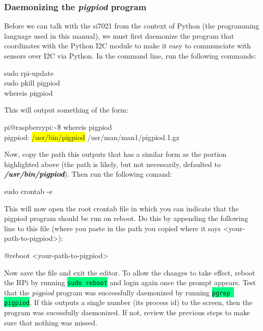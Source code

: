 \documentclass{article}
\newcommand*{\myfont}{\fontfamily{pcr}\selectfont}
\newcommand{\codei}[1]{\colorbox{SpringGreen}{\texttt{#1}}} %
\newcommand{\codeb}[2]{
  \begin{tcolorbox}[width=\textwidth,colback={SpringGreen},title={#1},colbacktitle=DarkGreen,coltitle=SpringGreen]
    \myfont
    #2
  \end{tcolorbox}
} %
\newcommand{\outputb}[2]{
  \begin{tcolorbox}[width=\textwidth,colback={light-gray},title={#1},colbacktitle=gray,coltitle=light-gray]
    \myfont
    #2
  \end{tcolorbox}
} %
\newcommand{\loc}[1]{\textit{\textcolor{Black}{\textbf{#1}}}} %
\begin{document}
  \subsubsection{Daemonizing the \textit{pigpiod} program}
    Before we can talk with the si7021 from the context of Python (the programming language used in this manual), we must first daemonize the program that coordinates with the Python I2C module to make it easy to communciate with sensors over I2C via Python. In the command line, run the following commands:
    \codeb{Prep the environment and locate \textit{pigpiod}}
    {
      sudo rpi-update     \\
      sudo pkill pigpiod  \\
      whereis pigpiod
    }
    This will output something of the form:
    \outputb{\texttt{whereis pigpiod} command output}
    {
      pi@raspberrypi:\textasciitilde \$ whereis pigpiod \\
      pigpiod: \colorbox{Yellow}{/usr/bin/pigpiod} /usr/man/man1/pigpiod.1.gz
    }
    Now, copy the path this outputs that has a similar form as the portion highlighted above (the path is likely, but not necessarily, defaulted to \loc{/usr/bin/pigpiod}). Then run the following comand:
    \codeb{Open the root crontab}
    {
      sudo crontab -e
    }
    This will now open the root crontab file in which you can indicate that the pigpiod program should be run on reboot. Do this by appending the following line to this file (where you paste in the path you copied where it says <your-path-to-pigpiod>):
    \outputb{Daemonize \textit{pigpiod} command}
    {
      @reboot              <your-path-to-pigpiod>
    }
    Now save the file and exit the editor. To allow the changes to take effect, reboot the RPi by running \codei{sudo reboot} and login again once the prompt appears. Test that the \textit{pigpiod} program was successfully daemonized by running \codei{pgrep pigpiod}. If this outputs a single number (its process id) to the screen, then the program was sucessfully daemonized. If not, review the previous steps to make sure that nothing was missed.
\end{document}
